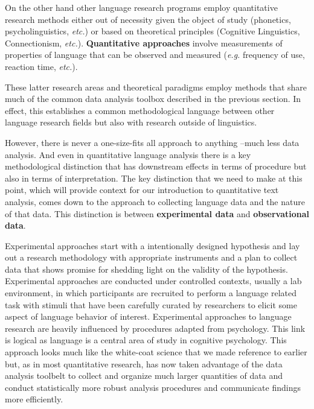 \documentclass[
  letterpaper,
  DIV=11,
  numbers=noendperiod]{scrreport}
\theoremstyle{definition}
\theoremstyle{remark}
\begin{document}
On the other hand other language research programs employ quantitative
research methods either out of necessity given the object of study
(phonetics, psycholinguistics, \emph{etc.}) or based on theoretical
principles (Cognitive Linguistics, Connectionism, \emph{etc.}).
\textbf{Quantitative approaches} involve measurements of properties of
language that can be observed and measured (\emph{e.g.} frequency of
use, reaction time, \emph{etc.}).

These latter research areas and theoretical paradigms employ methods
that share much of the common data analysis toolbox described in the
previous section. In effect, this establishes a common methodological
language between other language research fields but also with research
outside of linguistics.

However, there is never a one-size-fits all approach to anything --much
less data analysis. And even in quantitative language analysis there is
a key methodological distinction that has downstream effects in terms of
procedure but also in terms of interpretation. The key distinction that
we need to make at this point, which will provide context for our
introduction to quantitative text analysis, comes down to the approach
to collecting language data and the nature of that data. This
distinction is between \textbf{experimental
data} and \textbf{observational
data}.

Experimental approaches start with a intentionally designed hypothesis
and lay out a research methodology with appropriate instruments and a
plan to collect data that shows promise for shedding light on the
validity of the hypothesis. Experimental approaches are conducted under
controlled contexts, usually a lab environment, in which participants
are recruited to perform a language related task with stimuli that have
been carefully curated by researchers to elicit some aspect of language
behavior of interest. Experimental approaches to language research are
heavily influenced by procedures adapted from psychology. This link is
logical as language is a central area of study in cognitive psychology.
This approach looks much like the white-coat science that we made
reference to earlier but, as in most quantitative research, has now
taken advantage of the data analysis toolbelt to collect and organize
much larger quantities of data and conduct statistically more robust
analysis procedures and communicate findings more efficiently.
\end{document}
